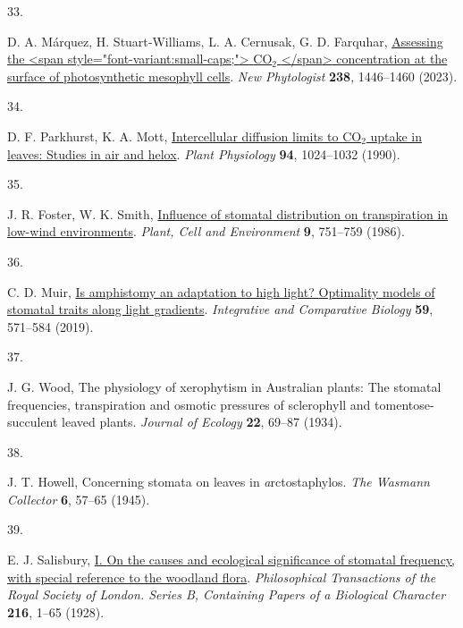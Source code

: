 \documentclass[
  letterpaper,
  DIV=11,
  numbers=noendperiod]{scrartcl}
\newlength{\cslhangindent}
\newlength{\csllabelwidth}
\newenvironment{CSLReferences}[2] %
 {\begin{list}{}{%
  \setlength{\itemindent}{0pt}
  \setlength{\leftmargin}{0pt}
  \setlength{\parsep}{0pt}
  \ifodd #1
   \setlength{\leftmargin}{\cslhangindent}
   \setlength{\itemindent}{-1\cslhangindent}
  \fi
  \setlength{\itemsep}{#2\baselineskip}}}
 {\end{list}}
\newcommand{\CSLLeftMargin}[1]{\parbox[t]{\csllabelwidth}{\strut#1\strut}}
\newcommand{\CSLRightInline}[1]{\parbox[t]{\linewidth - \csllabelwidth}{\strut#1\strut}}
\begin{document}
\begin{CSLReferences}{0}{1}
\CSLLeftMargin{33. }%
\CSLRightInline{D. A. Márquez, H. Stuart‐Williams, L. A. Cernusak, G. D.
Farquhar, \href{https://doi.org/10.1111/nph.18784}{Assessing the
{\textless{}}span style="font-variant:small-caps;"{\textgreater{}}
{CO}\(_{\textrm{2}}\) {\textless{}}/span{\textgreater{}} concentration
at the surface of photosynthetic mesophyll cells}. \emph{New
Phytologist} \textbf{238}, 1446--1460 (2023).}

\CSLLeftMargin{34. }%
\CSLRightInline{D. F. Parkhurst, K. A. Mott,
\href{https://doi.org/10.1104/pp.94.3.1024}{Intercellular diffusion
limits to {CO}\(_{\textrm{2}}\) uptake in leaves: Studies in air and
helox}. \emph{Plant Physiology} \textbf{94}, 1024--1032 (1990).}

\CSLLeftMargin{35. }%
\CSLRightInline{J. R. Foster, W. K. Smith,
\href{https://doi.org/10.1111/j.1365-3040.1986.tb02108.x}{Influence of
stomatal distribution on transpiration in low-wind environments}.
\emph{Plant, Cell and Environment} \textbf{9}, 751--759 (1986).}

\CSLLeftMargin{36. }%
\CSLRightInline{C. D. Muir, \href{https://doi.org/10.1093/icb/icz085}{Is
amphistomy an adaptation to high light? {Optimality} models of stomatal
traits along light gradients}. \emph{Integrative and Comparative
Biology} \textbf{59}, 571--584 (2019).}

\CSLLeftMargin{37. }%
\CSLRightInline{J. G. Wood, The physiology of xerophytism in
{Australian} plants: The stomatal frequencies, transpiration and osmotic
pressures of sclerophyll and tomentose-succulent leaved plants.
\emph{Journal of Ecology} \textbf{22}, 69--87 (1934).}

\CSLLeftMargin{38. }%
\CSLRightInline{J. T. Howell, Concerning stomata on leaves in
\emph{a}rctostaphylos. \emph{The Wasmann Collector} \textbf{6}, 57--65
(1945).}

\CSLLeftMargin{39. }%
\CSLRightInline{E. J. Salisbury,
\href{https://doi.org/10.1098/rstb.1928.0001}{I. {On} the causes and
ecological significance of stomatal frequency, with special reference to
the woodland flora}. \emph{Philosophical Transactions of the Royal
Society of London. Series B, Containing Papers of a Biological
Character} \textbf{216}, 1--65 (1928).}


\end{CSLReferences}
\end{document}

